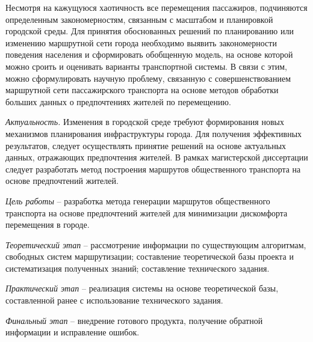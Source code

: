 Несмотря на кажущуюся хаотичность все перемещения пассажиров, подчиняются определенным закономерностям, 
связанным с масштабом и планировкой городской среды. Для принятия обоснованных решений по планированию или 
изменению маршрутной сети города необходимо выявить закономерности поведения населения и сформировать 
обобщенную модель, на основе которой можно сроить и оценивать варианты транспортной системы. В связи с этим, 
можно сформулировать научную проблему, связанную с совершенствованием маршрутной сети пассажирского 
транспорта  на основе методов обработки больших данных о предпочтениях жителей по перемещению. 

\emph{Актуальность.} Изменения в городской среде требуют формирования новых механизмов 
планирования инфраструктуры города. Для получения эффективных результатов, следует осуществлять 
принятие решений на основе актуальных данных, отражающих предпочтения жителей. В рамках 
магистерской диссертации следует разработать метод построения маршрутов общественного транспорта 
на основе предпочтений жителей.


\emph{Цель работы} -- разработка метода генерации маршрутов общественного транспорта на основе 
предпочтений жителей для минимизации дискомфорта перемещения в городе.

\emph{Теоретический этап} -- рассмотрение информации по существующим алгоритмам, свободных систем 
маршрутизации; составление теоретической базы проекта и систематизация полученных знаний; 
составление технического задания. 

\emph{Практический этап} -- реализация системы на основе теоретической базы, составленной ранее с 
использование технического задания.

\emph{Финальный этап} -- внедрение готового продукта, получение обратной информации и исправление 
ошибок.

